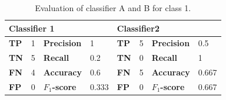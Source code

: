 \begin{table}[h]
\centering
\renewcommand{\arraystretch}{1.25}
\begin{tabular}{l|l|l|l|l|l|l|l}
\multicolumn{4}{l}{{\bf Classifier 1}} & \multicolumn{4}{l}{{\bf Classifier2}} \\ \hline
\textbf{TP}     & 1     & \textbf{Precision}     &  1   & \textbf{TP}     & 5     & \textbf{Precision}    &   0.5  \\\hline
\textbf{TN}     & 5     & \textbf{Recall}        &  0.2   & \textbf{TN}    & 0     & \textbf{Recall}       & 1    \\\hline
\textbf{FN}     & 4     & \textbf{Accuracy}      &  0.6   & \textbf{FN}     & 5     & \textbf{Accuracy}     & 0.667    \\\hline
\textbf{FP}     & 0     & \textbf{$F_{1}$-score}      &  0.333   & \textbf{FP}     & 0     &  \textbf{$F_{1}$-score}             &    0.667
\end{tabular}
\caption{Evaluation of classifier A and B for class 1. }
\label{tab:results_bad_classifiers}
\end{table}

